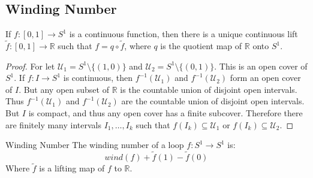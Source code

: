 \documentclass{book}                                                           %
\begin{document}
    \subsection{Winding Number}
        \begin{theorem}
            If $f:[0,1]\rightarrow{S}^{1}$ is a continuous
            function, then there is a unique continuous lift
            $\tilde{f}:[0,1]\rightarrow\mathbb{R}$ such that
            $f=q\circ\tilde{f}$, where $q$ is the quotient map
            of $\mathbb{R}$ onto $S^{1}$.
        \end{theorem}
        \begin{proof}
            For let $\mathcal{U}_{1}=S^{1}\setminus\{(1,0)\}$ and
            $\mathcal{U}_{2}=S^{1}\setminus\{(0,1)\}$. This is an
            open cover of $S^{1}$. If $f:I\rightarrow{S}^{1}$ is
            continuous, then $f^{-1}(\mathcal{U}_{1})$ and
            $f^{-1}(\mathcal{U}_{2})$ form an open cover of
            $I$. But any open subset of $\mathbb{R}$ is the
            countable union of disjoint open intervals. Thus
            $f^{-1}(\mathcal{U}_{1})$ and
            $f^{-1}(\mathcal{U}_{2})$ are the countable union of
            disjoint open intervals. But $I$ is compact, and
            thus any open cover has a finite subcover. Therefore
            there are finitely many intervals $I_{1},\dots,I_{k}$
            such that $f(I_{k})\subseteq\mathcal{U}_{1}$ or
            $f(I_{k})\subseteq\mathcal{U}_{2}$.
        \end{proof}
        \begin{ldefinition}{Winding Number}
            The winding number of a loop
            $f:S^{1}\rightarrow{S}^{1}$ is:
            \begin{equation}
                wind(f)+\tilde{f}(1)-\tilde{f}(0)
            \end{equation}
            Where $\tilde{f}$ is a lifting map of $f$ to
            $\mathbb{R}$.
        \end{ldefinition}
\end{document}
